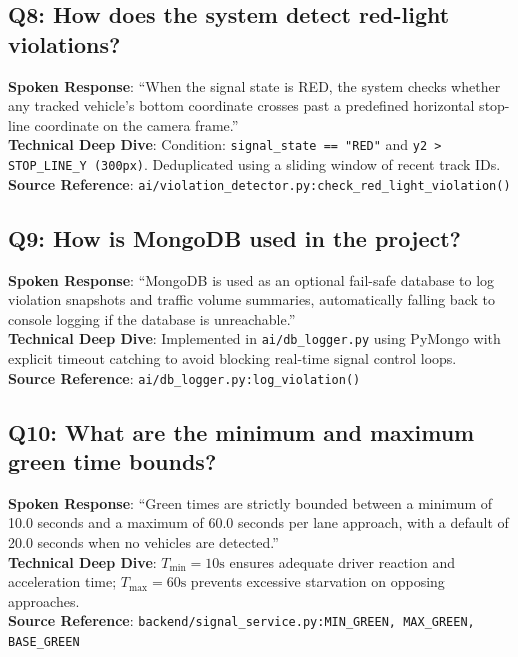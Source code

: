 \documentclass[11pt,a4paper,oneside]{report}
\begin{document}
\subsection*{Q8: How does the system detect red-light violations?}
\begin{interviewbox}
\textbf{Spoken Response}: ``When the signal state is RED, the system checks whether any tracked vehicle's bottom coordinate crosses past a predefined horizontal stop-line coordinate on the camera frame.''\\
\textbf{Technical Deep Dive}: Condition: \texttt{signal\_state == "RED"} and \texttt{y2 > STOP\_LINE\_Y (300px)}. Deduplicated using a sliding window of recent track IDs.\\
\textbf{Source Reference}: \texttt{ai/violation\_detector.py:check\_red\_light\_violation()}
\end{interviewbox}

\subsection*{Q9: How is MongoDB used in the project?}
\begin{interviewbox}
\textbf{Spoken Response}: ``MongoDB is used as an optional fail-safe database to log violation snapshots and traffic volume summaries, automatically falling back to console logging if the database is unreachable.''\\
\textbf{Technical Deep Dive}: Implemented in \texttt{ai/db\_logger.py} using PyMongo with explicit timeout catching to avoid blocking real-time signal control loops.\\
\textbf{Source Reference}: \texttt{ai/db\_logger.py:log\_violation()}
\end{interviewbox}

\subsection*{Q10: What are the minimum and maximum green time bounds?}
\begin{interviewbox}
\textbf{Spoken Response}: ``Green times are strictly bounded between a minimum of 10.0 seconds and a maximum of 60.0 seconds per lane approach, with a default of 20.0 seconds when no vehicles are detected.''\\
\textbf{Technical Deep Dive}: $T_{\text{min}} = 10\text{s}$ ensures adequate driver reaction and acceleration time; $T_{\text{max}} = 60\text{s}$ prevents excessive starvation on opposing approaches.\\
\textbf{Source Reference}: \texttt{backend/signal\_service.py:MIN\_GREEN, MAX\_GREEN, BASE\_GREEN}
\end{interviewbox}
\end{document}
